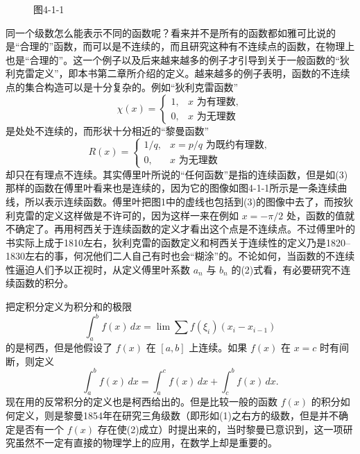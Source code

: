 \begin{figure}[htbp]
\centering
{}
\caption*{图4-1-1}
\end{figure}

同一个级数怎么能表示不同的函数呢？看来并不是所有的函数都如雅可比说的是“合理的”函数，而可以是不连续的，而且研究这种有不连续点的函数，在物理上也是“合理的”。这一个例子以及后来越来越多的例子才引导到关于一般函数的“狄利克雷定义”，即本书第二章所介绍的定义。越来越多的例子表明，函数的不连续点的集合构造可以是十分复杂的。例如“狄利克雷函数”
\begin{equation}
 \chi(x)=
 \begin{cases}
 1,&x\text{ 为有理数},\\
 0,&x\text{ 为无理数}
 \end{cases}
 \tag{4}
\end{equation}
是处处不连续的，而形状十分相近的“黎曼函数”
\begin{equation}
 R(x)=
 \begin{cases}
 1/q,&x=p/q\text{ 为既约有理数},\\
 0,&x\text{ 为无理数}
 \end{cases}
 \tag{5}
\end{equation}
却只在有理点不连续。其实傅里叶所说的“任何函数”是指的连续函数，但是如(3)那样的函数在傅里叶看来也是连续的，因为它的图像如图4-1-1所示是一条连续曲线，所以表示连续函数。傅里叶把图1中的虚线也包括到(3)的图像中去了，而按狄利克雷的定义这样做是不许可的，因为这样一来在例如 $x=-\pi/2$ 处，函数的值就不确定了。再用柯西关于连续函数的定义才看出这个点是不连续点。不过傅里叶的书实际上成于1810左右，狄利克雷的函数定义和柯西关于连续性的定义乃是1820--1830左右的事，何况他们二人自己有时也会“糊涂”的。不论如何，当函数的不连续性逼迫人们予以正视时，从定义傅里叶系数 $a_n$ 与 $b_n$ 的(2)式看，有必要研究不连续函数的积分。

把定积分定义为积分和的极限
\begin{equation}
 \int_a^b f(x)\,dx=\lim\sum f(\xi_i)(x_i-x_{i-1})
 \tag{6}
\end{equation}
的是柯西，但是他假设了 $f(x)$ 在 $[a,b]$ 上连续。如果 $f(x)$ 在 $x=c$ 时有间断，则定义
\[
 \int_a^b f(x)\,dx=\int_a^c f(x)\,dx+\int_c^b f(x)\,dx.
\]
现在用的反常积分的定义也是柯西给出的。但是比较一般的函数 $f(x)$ 的积分如何定义，则是黎曼1854年在研究三角级数（即形如(1)之右方的级数，但是并不确定是否有一个 $f(x)$ 存在使(2)成立）时提出来的，当时黎曼已意识到，这一项研究虽然不一定有直接的物理学上的应用，在数学上却是重要的。

